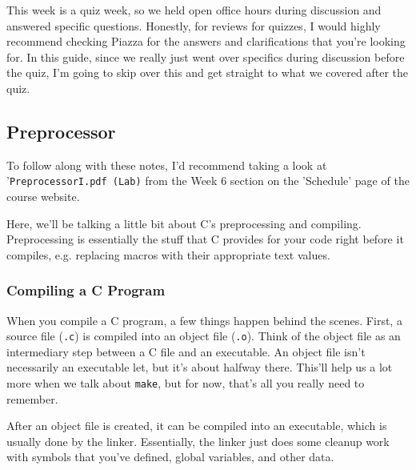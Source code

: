 \documentclass[english, 10pt]{article}
\begin{document}
This week is a quiz week, so we held open office hours during discussion and answered specific questions. Honestly, for reviews for quizzes, I would highly recommend checking Piazza for the answers and clarifications that you're looking for. In this guide, since we really just went over specifics during discussion before the quiz, I'm going to skip over this and get straight to what we covered after the quiz.

\subsection{Preprocessor}

To follow along with these notes, I'd recommend taking a look at '\texttt{PreprocessorI.pdf (Lab)} from the Week 6 section on the 'Schedule' page of the course website.\newline

Here, we'll be talking a little bit about C's preprocessing and compiling. Preprocessing is essentially the stuff that C provides for your code right before it compiles, e.g. replacing macros with their appropriate text values.

\subsubsection{Compiling a C Program}

When you compile a C program, a few things happen behind the scenes. First, a source file (\texttt{.c}) is compiled into an object file (\texttt{.o}). Think of the object file as an intermediary step between a C file and an executable. An object file isn't necessarily an executable let, but it's about halfway there. This'll help us a lot more when we talk about \texttt{make}, but for now, that's all you really need to remember.\newline

After an object file is created, it can be compiled into an executable, which is usually done by the linker. Essentially, the linker just does some cleanup work with symbols that you've defined, global variables, and other data.\newline
\end{document}

